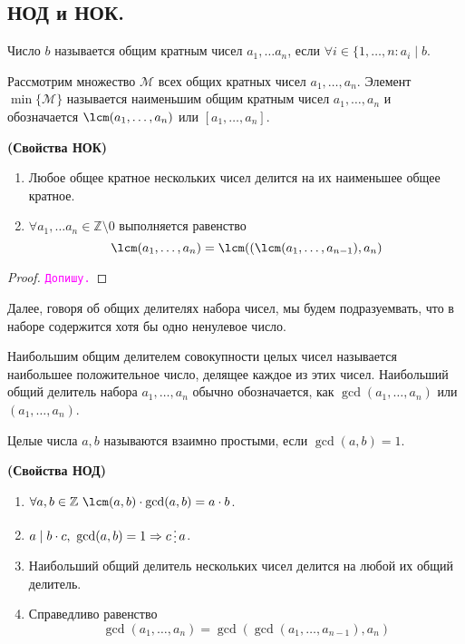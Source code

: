 \documentclass[11pt]{article}
\begin{document}
\subsection{НОД и НОК.}
\begin{definition}
	Число $b$ называется общим кратным чисел $a_1, \ldots a_n$, если $\forall i \in \{ 1, \ldots, n\colon a_i \mid b$.
\end{definition}
\begin{definition}
	Рассмотрим множество $\mathcal{M}$ всех общих кратных чисел $a_1, \ldots, a_n$. Элемент $\min\{\mathcal{M}\}$ называется наименьшим общим кратным чисел $a_1, \ldots, a_n$
	и обозначается $\lcm(a_1, \ldots, a_n)$ или $[a_1, \ldots, a_n]$.
\end{definition}
\begin{theorem}\textbf{(Свойства НОК)}
\begin{enumerate}
    \item Любое общее кратное нескольких чисел делится на их наименьшее общее кратное.

	\item $\forall a_{1}, \ldots a_n \in \mathbb{Z}\setminus{0}$ выполняется равенство
		  \[ \lcm(a_1, \ldots, a_n) = \lcm((\lcm(a_1, \ldots, a_{n - 1}), a_n ) \]
\end{enumerate}
\end{theorem}
\begin{proof} \textcolor{magenta}{\texttt{Допишу.}}
\end{proof}

Далее, говоря об общих делителях набора чисел, мы будем подразуемвать, что в наборе содержится хотя бы одно ненулевое число.


\begin{definition}

	Наибольшим общим делителем совокупности целых чисел называется наибольшее положительное число, делящее каждое из этих чисел.
	Наибольший общий делитель набора $a_1, \ldots, a_n$ обычно обозначается, как $\gcd(a_1, \ldots, a_n)$ или $(a_1, \ldots, a_n)$.

\end{definition}

\begin{definition}
	Целые числа $a, b$ называются взаимно простыми, если $\gcd(a, b) = 1$.
\end{definition}

\begin{theorem} \textbf{(Свойства НОД)}
	\begin{enumerate}
	    \item $\forall a, b \in \mathbb{Z}\ \lcm(a, b) \cdot \gcd(a, b) = a \cdot b$.

		\item $a \mid b \cdot c, \ \gcd(a, b) = 1 \Rightarrow c \divisible a$.

		\item Наибольший общий делитель нескольких чисел делится на любой их общий делитель.

		\item Справедливо равенство
			  \[ \gcd(a_1, \ldots, a_n) = \gcd(\gcd(a_1, \ldots, a_{n - 1}), a_n)\]
	\end{enumerate}
\end{theorem}
\end{document}
